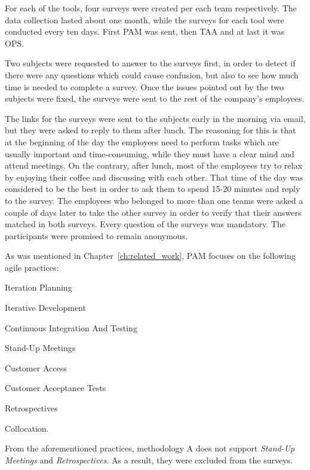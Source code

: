 For each of the tools, four surveys were created per each team respectively. The data collection lasted about one month, while the surveys for each tool were conducted every ten days. First \ac{PAM} was sent, then \ac{TAA} and at last it was \ac{OPS}.

Two subjects were requested to answer to the surveys first, in order to detect if there were any questions which could cause confusion, but also to see how much time is needed to complete a survey. Once the issues pointed out by the two subjects were fixed, the surveys were sent to the rest of the company's employees.

The links for the surveys were sent to the subjects early in the morning via email, but they were asked to reply to them after lunch. The reasoning for this is that at the beginning of the day the employees need to perform tasks which are usually important and time-consuming, while they must have a clear mind and attend meetings. On the contrary, after lunch, most of the employees try to relax by enjoying their coffee and discussing with each other. That time of the day was considered to be the best in order to ask them to spend 15-20 minutes and reply to the survey. The employees who belonged to more than one teams were asked a couple of days later to take the other survey in order to verify that their answers matched in both surveys. Every question of the surveys was mandatory. The participants were promised to remain anonymous.

As was mentioned in Chapter~\ref{ch:related_work}, \ac{PAM} focuses on the following agile practices:
\begin{inparaenum} [a\upshape)]
	\item Iteration Planning
	\item Iterative Development
	\item Continuous Integration And Testing
	\item Stand-Up Meetings
	\item Customer Access
	\item Customer Acceptance Tests
	\item Retrospectives
	\item Collocation.
\end{inparaenum}
From the aforementioned practices, methodology A does not support \textit{Stand-Up Meetings} and \textit{Retrospectives}. As a result, they were excluded from the surveys.

